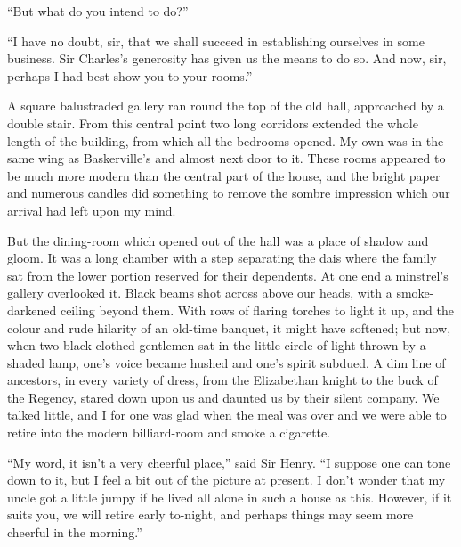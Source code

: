 \documentclass[paper=a5,BCOR=7mm,twoside,DIV=calc,12pt,usegeometry,openany,chapterprefix,endperiod,headings=big]{scrbook} %
\begin{document}
\enquote{But what do you intend to do?}

\enquote{I have no doubt, sir, that we shall succeed in establishing ourselves in some business. Sir Charles's generosity has given us the means to do so. And now, sir, perhaps I had best show you to your rooms.}

A square balustraded gallery ran round the top of the old hall, approached by a double stair. From this central point two long corridors extended the whole length of the building, from which all the bedrooms opened. My own was in the same wing as Baskerville's and almost next door to it. These rooms appeared to be much more modern than the central part of the house, and the bright paper and numerous candles did something to remove the sombre impression which our arrival had left upon my mind.

But the dining-room which opened out of the hall was a place of shadow and gloom. It was a long chamber with a step separating the dais where the family sat from the lower portion reserved for their dependents. At one end a minstrel's gallery overlooked it. Black beams shot across above our heads, with a smoke-darkened ceiling beyond them. With rows of flaring torches to light it up, and the colour and rude hilarity of an old-time banquet, it might have softened; but now, when two black-clothed gentlemen sat in the little circle of light thrown by a shaded lamp, one's voice became hushed and one's spirit subdued. A dim line of ancestors, in every variety of dress, from the Elizabethan knight to the buck of the Regency, stared down upon us and daunted us by their silent company. We talked little, and I for one was glad when the meal was over and we were able to retire into the modern billiard-room and smoke a cigarette.

\enquote{My word, it isn't a very cheerful place,} said Sir Henry. \enquote{I suppose one can tone down to it, but I feel a bit out of the picture at present. I don't wonder that my uncle got a little jumpy if he lived all alone in such a house as this. However, if it suits you, we will retire early to-night, and perhaps things may seem more cheerful in the morning.}
\end{document}

